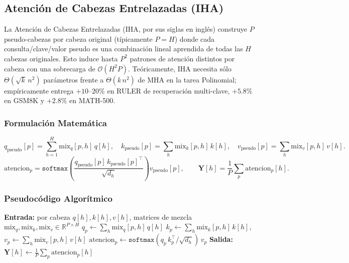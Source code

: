 \subsection{Atención de Cabezas Entrelazadas (IHA)}
La Atención de Cabezas Entrelazadas (IHA, por sus siglas en inglés) \citep{duvvuri_iha_2026} construye $P$ pseudo-cabezas por cabeza original (típicamente $P = H$) donde cada consulta/clave/valor pseudo es una combinación lineal aprendida de todas las $H$ cabezas originales. Esto induce hasta $P^2$ patrones de atención distintos por cabeza con una sobrecarga de $\mathcal{O}(H^2 P)$. Teóricamente, IHA necesita sólo $\Theta(\sqrt{k}\, n^2)$ parámetros frente a $\Theta(k\, n^2)$ de MHA en la tarea Polinomial; empíricamente entrega $+10$--$20\%$ en RULER de recuperación multi-clave, $+5.8\%$ en GSM8K y $+2.8\%$ en MATH-500.

\subsubsection{Formulación Matemática}
\[
q_{\text{pseudo}}[p] = \sum_{h=1}^{H} \text{mix}_q[p, h]\, q[h], \quad
k_{\text{pseudo}}[p] = \sum_{h} \text{mix}_k[p, h]\, k[h], \quad
v_{\text{pseudo}}[p] = \sum_{h} \text{mix}_v[p, h]\, v[h].
\]
\[
\text{atencion}_p = \texttt{softmax}\!\left(\frac{q_{\text{pseudo}}[p]\, k_{\text{pseudo}}[p]^\top}{\sqrt{d_h}}\right) v_{\text{pseudo}}[p],
\qquad
\mathbf{Y}[h] = \frac{1}{P} \sum_{p} \text{atencion}_p[h].
\]

\subsubsection{Pseudocódigo Algorítmico}
\begin{algorithmic}[1]
\State \textbf{Entrada:} por cabeza $q[h], k[h], v[h]$, matrices de mezcla $\text{mix}_q, \text{mix}_k, \text{mix}_v \in \mathbb{R}^{P \times H}$
    \State $q_p \gets \sum_h \text{mix}_q[p,h]\, q[h]$ 
    \State $k_p \gets \sum_h \text{mix}_k[p,h]\, k[h]$, \quad $v_p \gets \sum_h \text{mix}_v[p,h]\, v[h]$
    \State $\text{atencion}_p \gets \texttt{softmax}(q_p\, k_p^\top / \sqrt{d_h})\, v_p$
\EndFor
\State \textbf{Salida:} $\mathbf{Y}[h] \gets \frac{1}{P} \sum_p \text{atencion}_p[h]$ 
\end{algorithmic}

